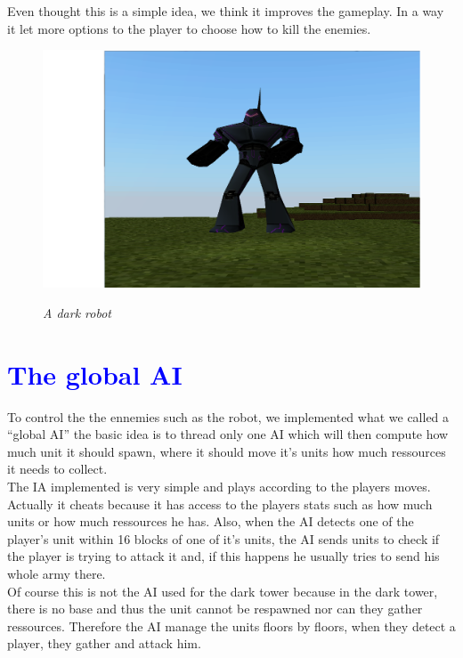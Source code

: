 \documentclass[article]{report}             %
\begin{document}
					Even thought this is a simple idea, we think it improves the gameplay. In a way it let more options to the player to choose how to kill the enemies.

					\begin{figure}[h]
								\includegraphics[width=15cm]{images/DarkRobot.png}
								\begin{center}\it A dark robot\end{center}
							\end{figure}
		
		\chapter{\textcolor{blue}{The global AI}}
				To control the the ennemies such as the robot, we implemented what we called a ``global AI'' the basic idea is to thread only one AI which will then compute how much unit it should spawn, where it should move it's units how much ressources it needs to collect.\\

				The IA implemented is very simple and plays according to the players moves. Actually it cheats because it has access to the players stats such as how much units or how much ressources he has. Also, when the AI detects one of the player's unit within 16 blocks of one of it's units, the AI sends units to check if the player is trying to attack it and, if this happens he usually tries to send his whole army there.\\

				Of course this is not the AI used for the dark tower because in the dark tower, there is no base and thus the unit cannot be respawned nor can they gather ressources. Therefore the AI manage the units floors by floors, when they detect a player, they gather and attack him.
\end{document}
